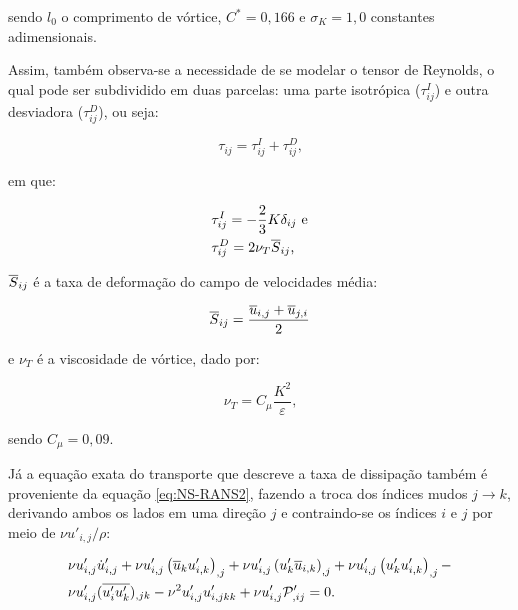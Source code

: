 \noindent sendo $l_0$ o comprimento de vórtice, $C^*=0,166$ e $\sigma_K=1,0$ constantes adimensionais.

Assim, também observa-se a necessidade de se modelar o tensor de Reynolds, o qual pode ser subdividido em duas parcelas: uma parte isotrópica ($\tau_{ij}^I$) e outra desviadora ($\tau_{ij}^D$), ou seja:

\begin{equation}
    \tau_{ij}=\tau_{ij}^I+\tau_{ij}^D\text{,}
\end{equation}

\noindent em que:

\begin{subequations}
    \begin{align}
         & \tau_{ij}^I=-\frac{2}{3}K\delta_{ij}\text{ e} \\
         & \tau_{ij}^D=2\nu_T\overline{S}_{ij}\text{,}
    \end{align}
\end{subequations}

\noindent $\overline{S}_{ij}$ é a taxa de deformação do campo de velocidades média:

\begin{equation}
    \overline{S}_{ij}=\frac{\overline{u}_{i,j}+\overline{u}_{j,i}}{2}
\end{equation}

\noindent e $\nu_T$ é a viscosidade de vórtice, dado por:

\begin{equation}
    \nu_T=C_\mu\frac{K^2}{\varepsilon}\text{,}
\end{equation}

\noindent sendo $C_\mu=0,09$.

Já a equação exata do transporte que descreve a taxa de dissipação também é proveniente da equação \ref{eq:NS-RANS2}, fazendo a troca dos índices mudos $j\to k$, derivando ambos os lados em uma direção $j$ e contraindo-se os índices $i$ e $j$ por meio de $\nu u'_{i,j}/\rho$:

\begin{equation}
    \begin{split}
        &\nu u'_{i,j}\dot{u}'_{i,j}+\nu u'_{i,j}\left({\overline{u}_ku'_{i,k}}\right)_{,j}+\nu u'_{i,j}\left({u'_k\overline{u}_{i,k}}\right)_{,j}+\nu u'_{i,j}\left({u'_ku'_{i,k}}\right)_{,j}-\\
        &\nu u'_{i,j}(\overline{u'_iu'_k})_{,jk}-\nu^2u'_{i,j}u'_{i,jkk}+\nu u'_{i,j}\mathcal{P}'_{,ij}=0\text{.}
    \end{split}
\end{equation}

